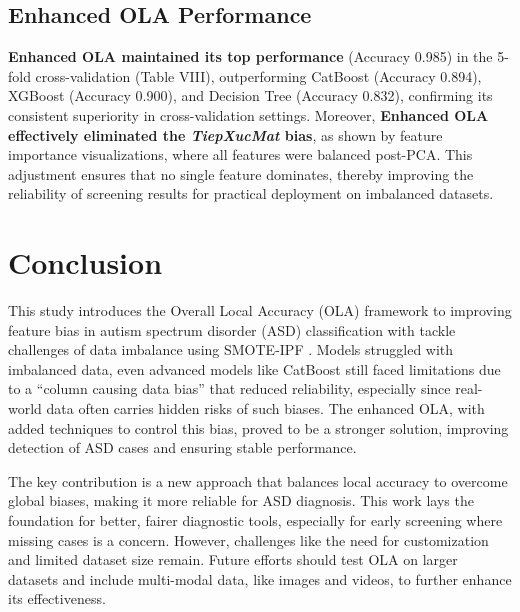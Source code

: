 \documentclass[conference]{IEEEtran}
\begin{document}
\subsection{Enhanced OLA Performance} \textbf{Enhanced OLA maintained its top performance} (Accuracy 0.985) in the 5-fold cross-validation (Table VIII), outperforming CatBoost (Accuracy 0.894), XGBoost (Accuracy 0.900), and Decision Tree (Accuracy 0.832), confirming its consistent superiority in cross-validation settings. Moreover, \textbf{Enhanced OLA effectively eliminated the \textit{TiepXucMat} bias}, as shown by feature importance visualizations, where all features were balanced post-PCA. This adjustment ensures that no single feature dominates, thereby improving the reliability of screening results for practical deployment on imbalanced datasets.

\section{Conclusion}
This study introduces the Overall Local Accuracy (OLA) framework to improving feature bias in autism spectrum disorder (ASD) classification with tackle challenges of data imbalance using SMOTE-IPF . Models struggled with imbalanced data, even advanced models like CatBoost still faced limitations due to a ``column causing data bias'' that reduced reliability, especially since real-world data often carries hidden risks of such biases. The enhanced OLA, with added techniques to control this bias, proved to be a stronger solution, improving detection of ASD cases and ensuring stable performance.

The key contribution is a new approach that balances local accuracy to overcome global biases, making it more reliable for ASD diagnosis. This work lays the foundation for better, fairer diagnostic tools, especially for early screening where missing cases is a concern. However, challenges like the need for customization and limited dataset size remain. Future efforts should test OLA on larger datasets and include multi-modal data, like images and videos, to further enhance its effectiveness.
\end{document}
